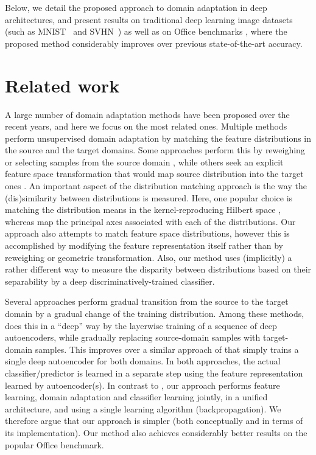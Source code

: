\documentclass{article}
\begin{document}
Below, we detail the proposed approach to domain adaptation in deep architectures, and present results on traditional deep learning image datasets (such as MNIST~\cite{LeCun98} and SVHN~\cite{Netzer11}) as well as on {\sc Office} benchmarks \cite{Saenko10}, where the proposed method considerably improves over previous state-of-the-art accuracy.




 \section{Related work}
\label{sec:related}

A large number of domain adaptation methods have been proposed over the recent years, and here we focus on the most related ones. Multiple methods perform unsupervised domain adaptation by matching the feature distributions in the source and the target domains. Some approaches perform this by reweighing or selecting samples from the source domain \cite{Borgwardt06,Huang06,Gong13}, while others seek an explicit feature space transformation that would map source distribution into the target ones \cite{Pan11,Gopalan11,Baktashmotlagh13}. An important aspect of the distribution matching approach is the way the (dis)similarity between distributions is measured.  Here, one popular choice is matching the distribution means in the kernel-reproducing Hilbert space \cite{Borgwardt06,Huang06}, whereas \cite{Gong12,Fernando13} map the principal axes associated with each of the distributions. Our approach also attempts to match feature space distributions, however this is accomplished by modifying the feature representation itself rather than by reweighing or geometric transformation. Also, our method uses (implicitly) a rather different way to measure the disparity between distributions based on their separability by a deep discriminatively-trained classifier.

Several approaches perform gradual transition from the source to the target domain \cite{Gopalan11,Gong12} by a gradual change of the training distribution. Among these methods, \cite{Chopra13} does this in a ``deep'' way by the layerwise training of a sequence of deep autoencoders, while gradually replacing source-domain samples with target-domain samples. This improves over a similar approach of \cite{Glorot11} that simply trains a single deep autoencoder for both domains. In both approaches, the actual classifier/predictor is learned in a separate step using the feature representation learned by autoencoder(s). In contrast to \cite{Glorot11,Chopra13}, our approach performs feature learning, domain adaptation and classifier learning jointly, in a unified architecture, and using a single learning algorithm (backpropagation). We therefore argue that our approach is simpler (both conceptually and in terms of its implementation). Our method also achieves considerably better results on the popular {\sc Office} benchmark.
\end{document}

